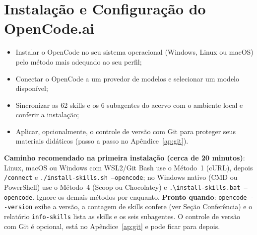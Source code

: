 \chapter{Instala{\c c}{\~a}o e Configura{\c c}{\~a}o do OpenCode.ai}
\label{cap:instalacao}

\begin{objetivos}
\begin{itemize}
  \item Instalar o OpenCode no seu sistema operacional (Windows, Linux ou macOS) pelo m{\'e}todo mais adequado ao seu perfil;
  \item Conectar o OpenCode a um provedor de modelos e selecionar um modelo dispon{\'i}vel;
  \item Sincronizar as 62 skills e os 6 subagentes do acervo com o ambiente local e conferir a instala{\c c}{\~a}o;
  \item Aplicar, opcionalmente, o controle de vers{\~a}o com Git para proteger seus materiais did{\'a}ticos (passo a passo no Ap{\^e}ndice~\ref{ap:git}).
\end{itemize}
\end{objetivos}

\begin{dicaopencode}
\textbf{Caminho recomendado na primeira instala{\c c}{\~a}o (cerca de 20 minutos)}: Linux, macOS ou Windows com WSL2/Git Bash use o M{\'e}todo~1 (cURL), depois \texttt{/connect} e \texttt{./install-skills.sh --opencode}; no Windows nativo (CMD ou PowerShell) use o M{\'e}todo~4 (Scoop ou Chocolatey) e \texttt{.\textbackslash install-skills.bat --opencode}. Ignore os demais m{\'e}todos por enquanto. \textbf{Pronto quando}: \texttt{opencode -{}-version} exibe a vers{\~a}o, a contagem de skills confere (ver Se{\c c}{\~a}o Confer{\^e}ncia) e o relat{\'o}rio \texttt{info-skills} lista as skills e os seis subagentes. O controle de vers{\~a}o com Git {\'e} opcional, est{\'a} no Ap{\^e}ndice~\ref{ap:git} e pode ficar para depois.
\end{dicaopencode}


